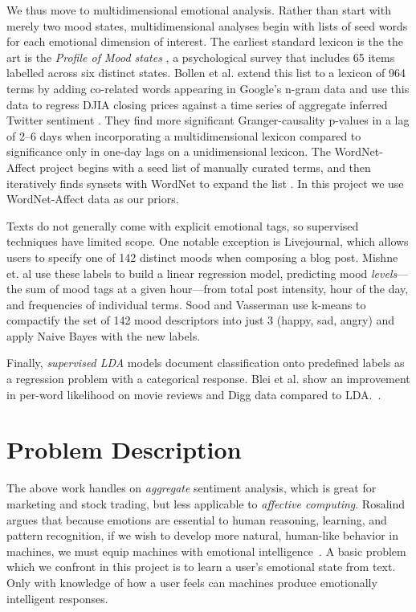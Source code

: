 \documentclass{article}
\begin{document}
We thus move to multidimensional emotional analysis. Rather than
start with merely two mood states, multidimensional analyses begin
with lists of seed words for each emotional dimension of interest.
The earliest standard lexicon is the the art is the \emph{Profile
of Mood states} \citep{mcnair71}, a psychological survey that
includes 65 items labelled across six distinct states. Bollen et
al. extend this list to a lexicon of 964 terms by adding co-related
words appearing in Google's n-gram data and use this data to regress
DJIA closing prices against a time series of aggregate inferred
Twitter sentiment \citep{bollen11}. They find more significant
Granger-causality p-values in a lag of 2--6 days when incorporating
a multidimensional lexicon compared to significance only in one-day
lags on a unidimensional lexicon. The WordNet-Affect project begins
with a seed list of manually curated terms, and then iteratively
finds synsets with WordNet to expand the list \citep{strapparava04}.
In this project we use WordNet-Affect data as our priors.

Texts do not generally come with explicit emotional tags, so
supervised techniques have limited scope. One notable exception is
Livejournal, which allows users to specify one of 142 distinct moods
when composing a blog post. Mishne et. al \citep{mishne06} use these
labels to build a linear regression model, predicting mood
\emph{levels}---the sum of mood tags at a given hour---from total
post intensity, hour of the day, and frequencies of individual
terms. Sood and Vasserman use k-means to compactify the set of 142
mood descriptors into just 3 (happy, sad, angry) and apply Naive Bayes
with the new labels.

Finally, \emph{supervised LDA} models document classification onto
predefined labels as a regression problem with a categorical response.
Blei et al. show an improvement in per-word likelihood on movie reviews
and Digg data compared to LDA.~\citep{blei07}.

\section{Problem Description}
The above work handles on \emph{aggregate} sentiment analysis, which
is great for marketing and stock trading, but less applicable to
\emph{affective computing}. Rosalind argues that because emotions
are essential to human reasoning, learning, and pattern recognition,
if we wish to develop more natural, human-like behavior in machines,
we must equip machines with emotional intelligence~\citep{picard97}.
A basic problem which we confront in this project is to learn a
user's emotional state from text. Only with knowledge of how a user
feels can machines produce emotionally intelligent responses.
\end{document}
